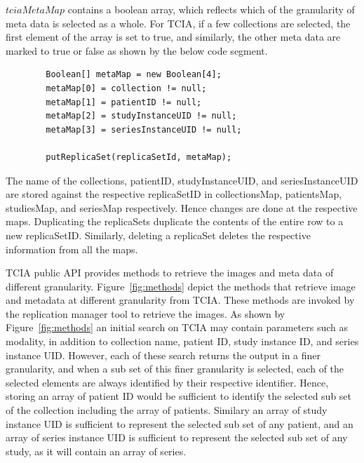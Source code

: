 \documentclass[conference]{IEEEtran}
\begin{document}
$tciaMetaMap$ contains a boolean array, which reflects which of the granularity of meta data is selected as a whole. For TCIA, if a few collections are selected, the first element of the array is set to true, and similarly, the other meta data are marked to true or false as shown by the below code segment.
\begin{lstlisting}  
        Boolean[] metaMap = new Boolean[4];
        metaMap[0] = collection != null;
        metaMap[1] = patientID != null;
        metaMap[2] = studyInstanceUID != null;
        metaMap[3] = seriesInstanceUID != null;

        putReplicaSet(replicaSetId, metaMap);
\end{lstlisting} 
The name of the collections, patientID, studyInstanceUID, and seriesInstanceUID are stored against the respective replicaSetID in collectionsMap, patientsMap, studiesMap, and seriesMap respectively. Hence changes are done at the respective maps. Duplicating the replicaSets duplicate the contents of the entire row to a new replicaSetID. Similarly, deleting a replicaSet deletes the respective information from all the maps.

TCIA public API provides methods to retrieve the images and meta data of different granularity. Figure~\ref{fig:methods} depict the methods that retrieve image and metadata at different granularity from TCIA. These methods are invoked by the replication manager tool to retrieve the images. As shown by Figure~\ref{fig:methods} an initial search on TCIA may contain parameters such as modality, in addition to collection name, patient ID, study instance ID, and series instance UID. However, each of these search returns the output in a finer granularity, and when a sub set of this finer granularity is selected, each of the selected elements are always identified by their respective identifier. Hence, storing an array of patient ID would be sufficient to identify the selected sub set of the collection including the array of patients. Similary an array of study instance UID is sufficient to represent the selected sub set of any patient, and an array of series instance UID is sufficient to represent the selected sub set of any study, as it will contain an array of series.
\end{document}
